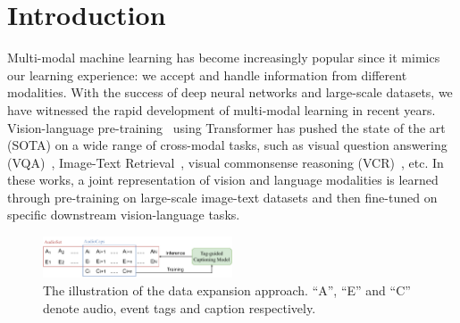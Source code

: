 \documentclass[sigconf]{acmart}
\begin{document}



\maketitle

\section{Introduction}
\label{sec:intro}

Multi-modal machine learning has become increasingly popular since it mimics our learning experience: we accept and handle information from different modalities. 
With the success of deep neural networks and large-scale datasets, we have witnessed the rapid development of multi-modal learning in recent years.
Vision-language pre-training~\cite{chen2020uniter,li2020oscar,lu2019vilbert,su2019vl} using Transformer has pushed the state of the art (SOTA) on a wide range of cross-modal tasks, such as visual question answering (VQA)~\cite{antol2015vqa}, Image-Text Retrieval~\cite{lin2014microsoft}, visual commonsense reasoning (VCR)~\cite{zellers2019recognition}, etc.
In these works, a joint representation of vision and language modalities is learned through pre-training on large-scale image-text datasets and then fine-tuned on specific downstream vision-language tasks.

\begin{figure}[!htpb]
    \centering
    \includegraphics[width=0.5\textwidth]{figs/Bootstrapping.pdf}
    \caption{The illustration of the data expansion approach. ``A'', ``E'' and ``C'' denote audio, event tags and caption respectively.}
    \label{fig:bootstrapping_data}
\end{figure}
\end{document}
